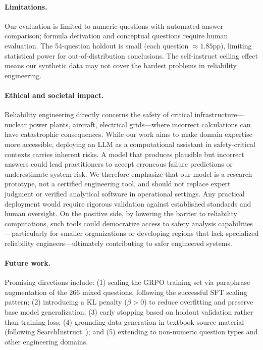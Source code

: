 \paragraph{Limitations.} Our evaluation is limited to numeric questions with automated answer comparison; formula derivation and conceptual questions require human evaluation. The 54-question holdout is small (each question $\approx 1.85$pp), limiting statistical power for out-of-distribution conclusions. The self-instruct ceiling effect means our synthetic data may not cover the hardest problems in reliability engineering.

\paragraph{Ethical and societal impact.} Reliability engineering directly concerns the safety of critical infrastructure---nuclear power plants, aircraft, electrical grids---where incorrect calculations can have catastrophic consequences. While our work aims to make domain expertise more accessible, deploying an LLM as a computational assistant in safety-critical contexts carries inherent risks. A model that produces plausible but incorrect answers could lead practitioners to accept erroneous failure predictions or underestimate system risk. We therefore emphasize that our model is a research prototype, not a certified engineering tool, and should not replace expert judgment or verified analytical software in operational settings. Any practical deployment would require rigorous validation against established standards and human oversight. On the positive side, by lowering the barrier to reliability computations, such tools could democratize access to safety analysis capabilities---particularly for smaller organizations or developing regions that lack specialized reliability engineers---ultimately contributing to safer engineered systems.

\paragraph{Future work.} Promising directions include: (1) scaling the GRPO training set via paraphrase augmentation of the 266 mixed questions, following the successful SFT scaling pattern; (2) introducing a KL penalty ($\beta > 0$) to reduce overfitting and preserve base model generalization; (3) early stopping based on holdout validation rather than training loss; (4) grounding data generation in textbook source material (following SearchInstruct~\cite{li2025searchinstruct}); and (5) extending to non-numeric question types and other engineering domains.

